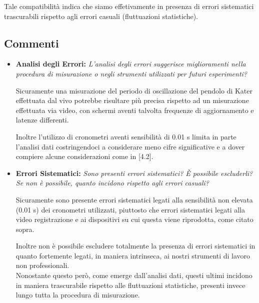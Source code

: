 \documentclass{article}
\begin{document}
Tale compatibilità indica che siamo effetivamente in presenza di errori sistematici trascurabili rispetto agli errori casuali (fluttuazioni statistiche).

\subsection{Commenti}
\begin{itemize}
    \item \textbf{Analisi degli Errori:} \textit{L'analisi degli errori suggerisce miglioramenti nella procedura di misurazione o negli strumenti utilizzati per futuri esperimenti?}
    
    Sicuramente una misurazione del periodo di oscillazione del pendolo di Kater effettuata dal vivo potrebbe risultare più precisa rispetto ad un misurazione effettuata via video, con schermi aventi talvolta frequenze di aggiornamento e latenze differenti.
    
    Inoltre l'utilizzo di cronometri aventi sensibilità di 0.01 s limita in parte l'analisi dati costringendoci a considerare meno cifre significative e a dover compiere alcune considerazioni come in [4.2]. 
    
    \item \textbf{Errori Sistematici:} \textit{Sono presenti errori sistematici? È possibile escluderli? Se non è possibile, quanto incidono rispetto agli errori casuali?}

    Sicuramente sono presente errori sistematici legati alla sensibilità non elevata (0.01 s) dei cronometri utilizzati, piuttosto che errori sistematici legati alla video registrazione e ai dispositivi su cui questa viene riprodotta, come citato sopra.
    
    Inoltre non è possibile escludere totalmente la presenza di errori sistematici in quanto fortemente legati, in maniera intrinseca, ai nostri strumenti di lavoro non professionali.
    \\Nonostante questo però, come emerge dall'analisi dati, questi ultimi incidono in maniera trascurabile rispetto alle fluttuazioni statistiche, presenti invece lungo tutta la procedura di misurazione.
    
\end{itemize}
\end{document}
